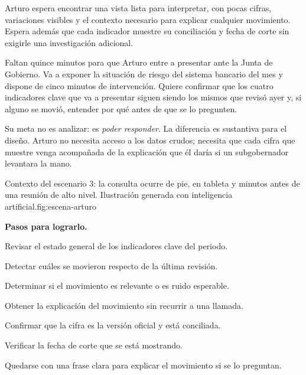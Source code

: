 
Arturo espera encontrar una vista lista para interpretar, con pocas cifras, variaciones
visibles y el contexto necesario para explicar cualquier movimiento. Espera además que cada
indicador muestre su conciliación y fecha de corte sin exigirle una investigación adicional.


Faltan quince minutos para que Arturo entre a presentar ante la Junta de Gobierno. Va a exponer
la situación de riesgo del sistema bancario del mes y dispone de cinco minutos de intervención.
Quiere confirmar que los cuatro indicadores clave que va a presentar siguen siendo los mismos
que revisó ayer y, si alguno se movió, entender por qué antes de que se lo pregunten.

Su meta no es analizar: es \emph{poder responder}. La diferencia es sustantiva para el diseño.
Arturo no necesita acceso a los datos crudos; necesita que cada cifra que muestre venga
acompañada de la explicación que él daría si un subgobernador levantara la mano.

  {Contexto del escenario 3: la consulta ocurre de pie, en tableta y minutos antes de una
   reunión de alto nivel. Ilustración generada con inteligencia artificial.}{fig:escena-arturo}

\textbf{\textcolor{uxnavy}{Pasos para lograrlo.}}

\begin{uxpreg}
\item Revisar el estado general de los indicadores clave del periodo.
\item Detectar cuáles se movieron respecto de la última revisión.
\item Determinar si el movimiento es relevante o es ruido esperable.
\item Obtener la explicación del movimiento sin recurrir a una llamada.
\item Confirmar que la cifra es la versión oficial y está conciliada.
\item Verificar la fecha de corte que se está mostrando.
\item Quedarse con una frase clara para explicar el movimiento si se lo preguntan.
\end{uxpreg}


